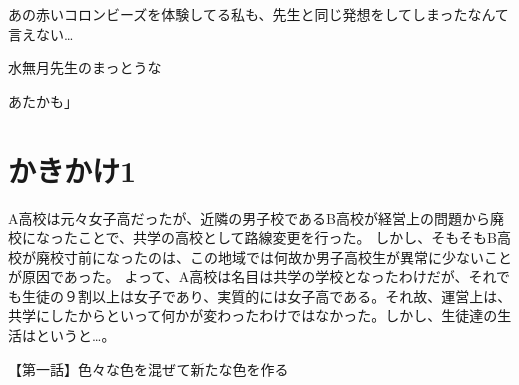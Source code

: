 あの赤いコロンビーズを体験してる私も、先生と同じ発想をしてしまったなんて言えない…



水無月先生のまっとうな

あたかも」




\section{かきかけ1}

A高校は元々女子高だったが、近隣の男子校であるB高校が経営上の問題から廃校になったことで、共学の高校として路線変更を行った。
しかし、そもそもB高校が廃校寸前になったのは、この地域では何故か男子高校生が異常に少ないことが原因であった。
よって、A高校は名目は共学の学校となったわけだが、それでも生徒の９割以上は女子であり、実質的には女子高である。それ故、運営上は、共学にしたからといって何かが変わったわけではなかった。しかし、生徒達の生活はというと…。


【第一話】色々な色を混ぜて新たな色を作る

